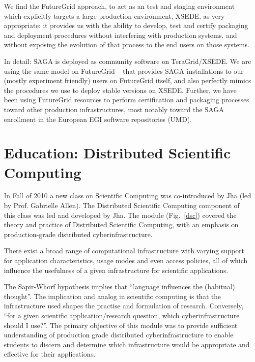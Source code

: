 \documentclass[]{paper}
\begin{document}
 We find the FutureGrid approach, to act as an test and staging
 environment which explicitly targets a large production environment,
 XSEDE, as very appropriate: it provides us with the ability to
 develop, test and certify packaging and deployment procedures without
 interfering with production systems, and without exposing the
 evolution of that process to the end users on those systems.  

 In detail: SAGA is deployed as community software on TeraGrid/XSEDE.
 We are using the same model on FutureGrid -- that provides SAGA
 installations to our (mostly experiment friendly) users on FutureGrid
 itself, and also perfectly mimics the procedures we use to deploy
 stable versions on XSEDE.  Further, we have been using FutureGrid
 resources to perform certification and packaging processes toward
 other production infrastructures, most notably toward the SAGA
 enrollment in the European EGI software repositories (UMD).


\section{Education: Distributed Scientific Computing}
\label{sec:edu}

In Fall of 2010 a new class on Scientific Computing was co-introduced
by Jha (led by Prof. Gabrielle Allen). The Distributed Scientific
Computing component of this class was led and developed by Jha.  The
module (Fig.~\ref{dsc}) covered the theory and practice of Distributed
Scientific Computing, with an emphasis on production-grade distributed
cyberinfrastructure.

There exist a broad range of computational infrastructure with varying
support for application characteristics, usage modes and even access
policies, all of which influence the usefulness of a given
infrastructure for scientific applications.

The Sapir-Whorf hypothesis implies that ``language influences the
(habitual) thought''. The implication and analog in scientific
computing is that the infrastructure used shapes the practise and
formulation of research. Conversely, ``for a given scientific
application/research question, which cyberinfrastructure should I
use?''.  The primary objective of this module was to provide
sufficient understanding of production grade distributed
cyberinfrastructure to enable students to discern and determine which
infrastructure would be appropriate and effective for their
applications.
\end{document}

